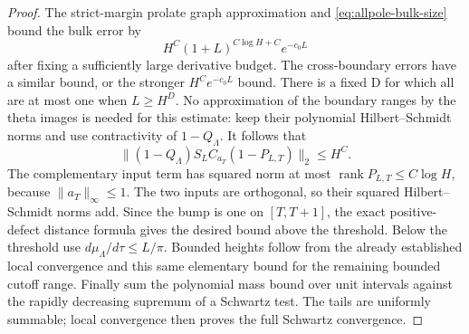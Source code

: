 \begin{proof}
The strict-margin prolate graph approximation and
\eqref{eq:allpole-bulk-size} bound the bulk error by
\[
             H^C(1+L)^{C\log H+C}e^{-c_0L}
\]
after fixing a sufficiently large derivative budget.  The
cross-boundary errors have a similar bound, or the stronger
$H^C e^{-c_0L}$ bound.  There is a fixed D for which all are at
most one when $L\geq H^D$.
No approximation of the boundary ranges by the theta images is
needed for this estimate: keep their polynomial Hilbert--Schmidt
norms and use contractivity of $1-Q_\Lambda$.
It follows that
\[
 \|(1-Q_\Lambda)S_LC_{a_T}(1-P_{L,T})\|_2\leq H^C.
\]
The complementary input term has squared norm at most
$\operatorname{rank}P_{L,T}\leq C\log H$, because
$\|a_T\|_\infty\leq1$.  The two inputs are orthogonal, so their
squared Hilbert--Schmidt norms add.  Since the bump is one on
$[T,T+1]$, the exact positive-defect distance formula gives the
desired bound above the threshold.
Below the threshold use $d\mu_\Lambda/d\tau\leq L/\pi$.
Bounded heights follow from the already established local
convergence and this same elementary bound for the remaining
bounded cutoff range.
Finally sum the polynomial mass bound over unit intervals against
the rapidly decreasing supremum of a Schwartz test.  The tails
are uniformly summable; local convergence then proves the full
Schwartz convergence.
\end{proof}

